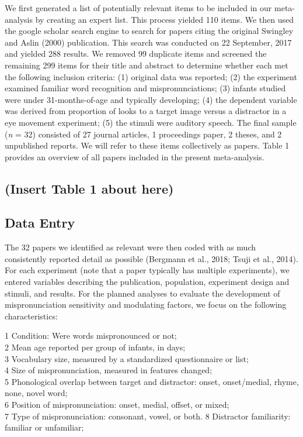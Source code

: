 \documentclass[man]{apa6}
\begin{document}
We first generated a list of potentially relevant items to be included in our meta-analysis by creating an expert list. This process yielded 110 items. We then used the google scholar search engine to search for papers citing the original Swingley and Aslin (2000) publication. This search was conducted on 22 September, 2017 and yielded 288 results. We removed 99 duplicate items and screened the remaining 299 items for their title and abstract to determine whether each met the following inclusion criteria: (1) original data was reported; (2) the experiment examined familiar word recognition and mispronunciations; (3) infants studied were under 31-months-of-age and typically developing; (4) the dependent variable was derived from proportion of looks to a target image versus a distractor in a eye movement experiment; (5) the stimuli were auditory speech. The final sample (\emph{n} = 32) consisted of 27 journal articles, 1 proceedings paper, 2 theses, and 2 unpublished reports. We will refer to these items collectively as papers. Table 1 provides an overview of all papers included in the present meta-analysis.

\hypertarget{insert-table-1-about-here}{%
\subsection{(Insert Table 1 about here)}\label{insert-table-1-about-here}}

\hypertarget{data-entry}{%
\subsection{Data Entry}\label{data-entry}}

The 32 papers we identified as relevant were then coded with as much consistently reported detail as possible (Bergmann et al., 2018; Tsuji et al., 2014). For each experiment (note that a paper typically has multiple experiments), we entered variables describing the publication, population, experiment design and stimuli, and results. For the planned analyses to evaluate the development of mispronunciation sensitivity and modulating factors, we focus on the following characteristics:

1 Condition: Were words mispronounced or not;\\
2 Mean age reported per group of infants, in days;\\
3 Vocabulary size, measured by a standardized questionnaire or list;\\
4 Size of mispronunciation, measured in features changed;\\
5 Phonological overlap between target and distractor: onset, onset/medial, rhyme, none, novel word;\\
6 Position of mispronunciation: onset, medial, offset, or mixed;\\
7 Type of mispronunciation: consonant, vowel, or both.
8 Distractor familiarity: familiar or unfamiliar;
\end{document}
